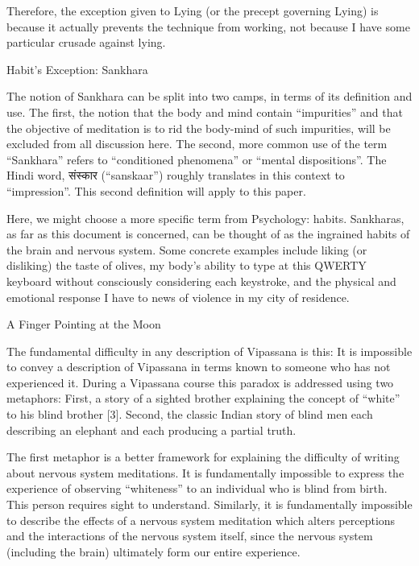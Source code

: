 \documentclass{article}
\begin{document}
Therefore, the exception given to Lying (or the precept governing Lying) is because it actually prevents the technique from working, not because I have some particular crusade against lying.


\begin{center}
  \LARGE{Habit's Exception: Sankhara}
\end{center}

The notion of Sankhara can be split into two camps, in terms of its definition and use. The first, the notion that the body and mind contain ``impurities'' and that the objective of meditation is to rid the body-mind of such impurities, will be excluded from all discussion here. The second, more common use of the term ``Sankhara'' refers to ``conditioned phenomena'' or ``mental dispositions''. The Hindi word, संस्कार (``sanskaar'') roughly translates in this context to ``impression''. This second definition will apply to this paper.

Here, we might choose a more specific term from Psychology: habits. Sankharas, as far as this document is concerned, can be thought of as the ingrained habits of the brain and nervous system. Some concrete examples include liking (or disliking) the taste of olives, my body's ability to type at this QWERTY keyboard without consciously considering each keystroke, and the physical and emotional response I have to news of violence in my city of residence.

\pagebreak

\begin{center}
  \Huge{A Finger Pointing at the Moon}
\end{center}

The fundamental difficulty in any description of Vipassana is this: It is impossible to convey a description of Vipassana in terms known to someone who has not experienced it. During a Vipassana course this paradox is addressed using two metaphors: First, a story of a sighted brother explaining the concept of ``white'' to his blind brother [3]. Second, the classic Indian story of blind men each describing an elephant and each producing a partial truth.

The first metaphor is a better framework for explaining the difficulty of writing about nervous system meditations. It is fundamentally impossible to express the experience of observing ``whiteness'' to an individual who is blind from birth. This person requires sight to understand. Similarly, it is fundamentally impossible to describe the effects of a nervous system meditation which alters perceptions and the interactions of the nervous system itself, since the nervous system (including the brain) ultimately form our entire experience.
\end{document}
